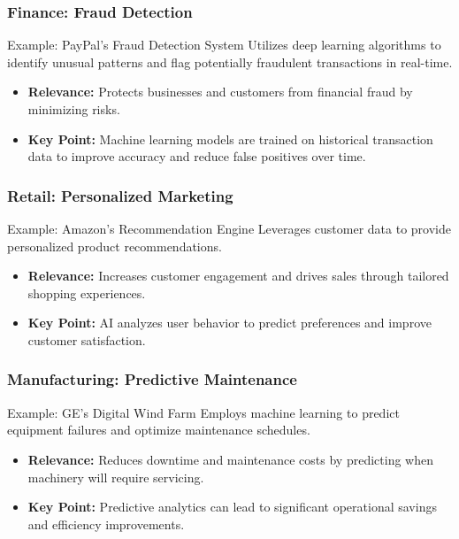 \documentclass{beamer}
\begin{document}
\begin{frame}[fragile]
    \frametitle{Finance: Fraud Detection}
    \begin{block}{Example: PayPal's Fraud Detection System}
        Utilizes deep learning algorithms to identify unusual patterns and flag potentially fraudulent transactions in real-time.
    \end{block}
    \begin{itemize}
        \item \textbf{Relevance:} Protects businesses and customers from financial fraud by minimizing risks.
        \item \textbf{Key Point:} Machine learning models are trained on historical transaction data to improve accuracy and reduce false positives over time.
    \end{itemize}
\end{frame}

\begin{frame}[fragile]
    \frametitle{Retail: Personalized Marketing}
    \begin{block}{Example: Amazon's Recommendation Engine}
        Leverages customer data to provide personalized product recommendations.
    \end{block}
    \begin{itemize}
        \item \textbf{Relevance:} Increases customer engagement and drives sales through tailored shopping experiences.
        \item \textbf{Key Point:} AI analyzes user behavior to predict preferences and improve customer satisfaction.
    \end{itemize}
\end{frame}

\begin{frame}[fragile]
    \frametitle{Manufacturing: Predictive Maintenance}
    \begin{block}{Example: GE's Digital Wind Farm}
        Employs machine learning to predict equipment failures and optimize maintenance schedules.
    \end{block}
    \begin{itemize}
        \item \textbf{Relevance:} Reduces downtime and maintenance costs by predicting when machinery will require servicing.
        \item \textbf{Key Point:} Predictive analytics can lead to significant operational savings and efficiency improvements.
    \end{itemize}
\end{frame}
\end{document}
